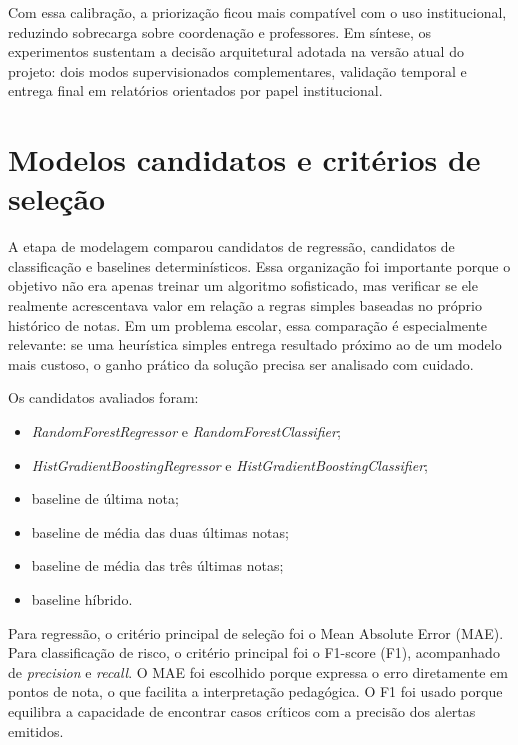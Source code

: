 Com essa calibra\c{c}\~ao, a prioriza\c{c}\~ao ficou mais compat\'ivel com o uso institucional, reduzindo sobrecarga sobre coordena\c{c}\~ao e professores. Em s\'intese, os experimentos sustentam a decis\~ao arquitetural adotada na vers\~ao atual do projeto: dois modos supervisionados complementares, valida\c{c}\~ao temporal e entrega final em relat\'orios orientados por papel institucional.

\section{Modelos candidatos e crit\'erios de sele\c{c}\~ao}
\label{sec:candidatos}
\label{sec:objetivo-experimentos}
\label{sec:organizacao-experimental}
\label{sec:baselines-utilizados}
\label{sec:metricas-regressao}
\label{sec:metricas-classificacao}

A etapa de modelagem comparou candidatos de regress\~ao, candidatos de classifica\c{c}\~ao e baselines determin\'isticos. Essa organiza\c{c}\~ao foi importante porque o objetivo n\~ao era apenas treinar um algoritmo sofisticado, mas verificar se ele realmente acrescentava valor em rela\c{c}\~ao a regras simples baseadas no pr\'oprio hist\'orico de notas. Em um problema escolar, essa compara\c{c}\~ao \'e especialmente relevante: se uma heur\'istica simples entrega resultado pr\'oximo ao de um modelo mais custoso, o ganho pr\'atico da solu\c{c}\~ao precisa ser analisado com cuidado.

Os candidatos avaliados foram:
\begin{itemize}
    \item \textit{RandomForestRegressor} e \textit{RandomForestClassifier};
    \item \textit{HistGradientBoostingRegressor} e \textit{HistGradientBoostingClassifier};
    \item baseline de \'ultima nota;
    \item baseline de m\'edia das duas \'ultimas notas;
    \item baseline de m\'edia das tr\^es \'ultimas notas;
    \item baseline h\'ibrido.
\end{itemize}

Para regress\~ao, o crit\'erio principal de sele\c{c}\~ao foi o Mean Absolute Error (MAE). Para classifica\c{c}\~ao de risco, o crit\'erio principal foi o F1-score (F1), acompanhado de \textit{precision} e \textit{recall}. O MAE foi escolhido porque expressa o erro diretamente em pontos de nota, o que facilita a interpreta\c{c}\~ao pedag\'ogica. O F1 foi usado porque equilibra a capacidade de encontrar casos cr\'iticos com a precis\~ao dos alertas emitidos.

